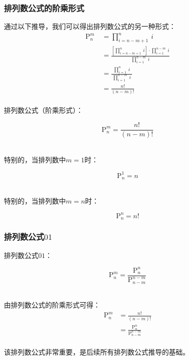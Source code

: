 \documentclass[UTF8]{ctexart}
\begin{document}
\subsubsection{排列数公式的阶乘形式}
    通过以下推导，我们可以得出排列数公式的另一种形式：\vspace{5pt}
    \setcounter{equation}{0}
    \begin{align}
        \mathrm{P}_n^m~
        &=\prod\nolimits_{i=n-m+1}^n~i\\[4mm]
        &=\frac{\left[\prod_{i=n-m+1}^n~i\right]\cdot\prod_{i=1}^{n-m}~i}{\prod_{i=1}^{n-m}~i}\\[4mm]
        &=\frac{\prod_{i=1}^{n}~i}{~\prod_{i=1}^{n-m}~i~}\\[4mm]
        &=\frac{n!}{(n-m)!}
    \end{align}\\
    排列数公式（阶乘形式）：
    \begin{large}
        \begin{equation*}
            \mathrm{P}_n^m=\frac{n!}{(n-m)!}
        \end{equation*}
    \end{large}\\
    特别的，当排列数中$m=1$时：
    \begin{large}
        \begin{equation*}
            \mathrm{P}_n^1=n
        \end{equation*}
    \end{large}\\
    特别的，当排列数中$m=n$时：
    \begin{large}
        \begin{equation*}
            \mathrm{P}_n^n=n!
        \end{equation*}
    \end{large}

\subsubsection{排列数公式$01$}
    排列数公式$01$：
    \begin{large}
        \begin{equation*}
            \mathrm{P}_n^m=\frac{\mathrm{P}_n^n}{\mathrm{P}_{n-m}^{n-m}}
        \end{equation*}
    \end{large}\\
    由排列数公式的阶乘形式可得：
    \setcounter{equation}{0}
    \begin{align}
        \mathrm{P}_n^m
        &=\frac{n!}{(n-m)!}\\[3mm]
        &=\frac{\mathrm{P}_n^n}{\mathrm{P}_{n-m}^{n-m}}
    \end{align}\\
    该排列数公式非常重要，是后续所有排列数公式推导的基础。
\end{document}
